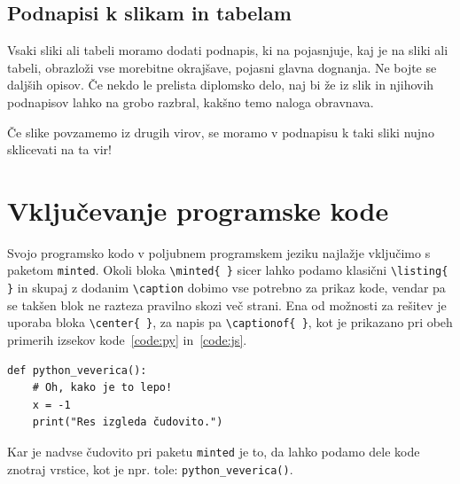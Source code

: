 \documentclass[a4paper,12pt,openright]{book}
\begin{document}
\section{Podnapisi k slikam in tabelam}

Vsaki sliki ali tabeli moramo dodati podnapis, ki na pojasnjuje, kaj je na sliki ali tabeli, obrazloži vse morebitne okrajšave, pojasni glavna dognanja. Ne bojte se daljših opisov.
Če nekdo le prelista diplomsko delo, naj bi že iz slik in njihovih podnapisov lahko na grobo razbral, kakšno temo naloga obravnava.

Če slike povzamemo iz drugih virov, se moramo v podnapisu k taki sliki nujno sklicevati na ta vir!


\chapter{Vključevanje programske kode}
\label{ch:koda}

Svojo programsko kodo v poljubnem programskem jeziku najlažje vključimo s paketom \texttt{minted}. Okoli bloka \texttt{\textbackslash minted\{ \}} sicer lahko podamo klasični \texttt{\textbackslash listing\{ \}} in skupaj z dodanim \texttt{\textbackslash caption} dobimo vse potrebno za prikaz kode, vendar pa se takšen blok ne razteza pravilno skozi več strani. Ena od možnosti za rešitev je uporaba bloka \texttt{\textbackslash center\{ \}}, za napis pa \texttt{\textbackslash captionof\{ \}}, kot je prikazano pri obeh primerih izsekov kode~\ref{code:py} in~\ref{code:js}.

\begin{center}

\begin{verbatim}
def python_veverica():
    # Oh, kako je to lepo!
    x = -1
    print("Res izgleda čudovito.")
\end{verbatim}

\label{code:py}
\end{center}

Kar je nadvse čudovito pri paketu \texttt{minted} je to, da lahko podamo dele kode znotraj vrstice, kot je npr. tole: \texttt{python_veverica()}.
\end{document}
